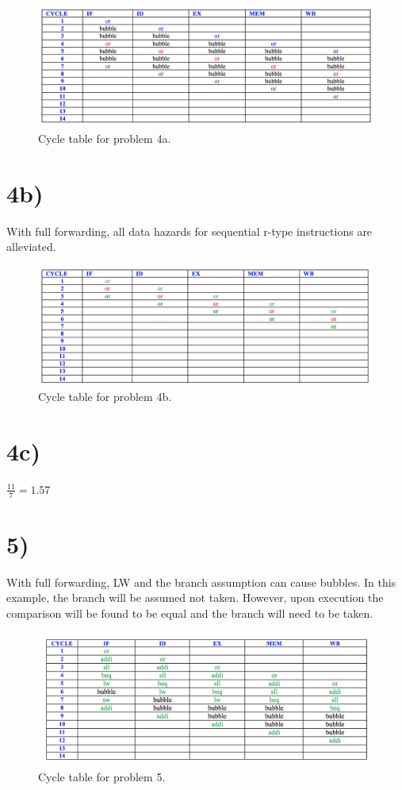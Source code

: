 \documentclass[a4paper,11pt]{article}
\begin{document}
\begin{figure}[h!]
\caption{Cycle table for problem 4a.} 
\centering
\includegraphics[width=1.1\textwidth]{hw6_p4a.png}
\end{figure}

\section*{4b)}
With full forwarding, all data hazards for sequential r-type instructions are alleviated.

\begin{figure}[h!]
\caption{Cycle table for problem 4b.} 
\centering
\includegraphics[width=1.1\textwidth]{hw6_p4b.png}
\end{figure}

\section*{4c)}
$\frac{11}{7} = 1.57 $


\section*{5)}
With full forwarding, LW and the branch assumption can cause bubbles.  In this example, the branch will be assumed not taken.  
However, upon execution the comparison will be found to be equal and the branch will need to be taken.  

\begin{figure}[h!]
\caption{Cycle table for problem 5.} 
\centering
\includegraphics[width=1.1\textwidth]{hw6_p5.png}
\end{figure}
\end{document}

